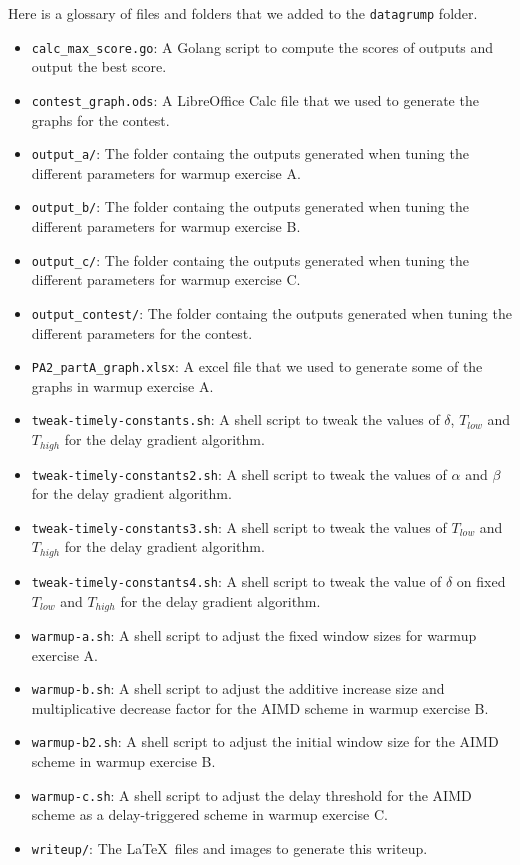 \documentclass[11pt,a4paper]{article}
\begin{document}
Here is a glossary of files and folders that we added to the \texttt{datagrump}
folder. \begin{itemize}
  \item \texttt{calc\_max\_score.go}: A Golang script to compute the scores of
    outputs and output the best score.
  \item \texttt{contest\_graph.ods}: A LibreOffice Calc file that we used to generate
    the graphs for the contest.
  \item \texttt{output\_a/}: The folder containg the outputs generated when
    tuning the different parameters for warmup exercise A.
  \item \texttt{output\_b/}: The folder containg the outputs generated when
    tuning the different parameters for warmup exercise B.
  \item \texttt{output\_c/}: The folder containg the outputs generated when
    tuning the different parameters for warmup exercise C.
  \item \texttt{output\_contest/}: The folder containg the outputs generated when
    tuning the different parameters for the contest.
  \item \texttt{PA2\_partA\_graph.xlsx}: A excel file that we used to generate
    some of the graphs in warmup exercise A.
  \item \texttt{tweak-timely-constants.sh}: A shell script to tweak the values
    of $\delta$, $T_{low}$ and $T_{high}$ for the delay gradient algorithm.
  \item \texttt{tweak-timely-constants2.sh}: A shell script to tweak the values
    of $\alpha$ and $\beta$ for the delay gradient algorithm.
  \item \texttt{tweak-timely-constants3.sh}: A shell script to tweak the values
    of $T_{low}$ and $T_{high}$ for the delay gradient algorithm.
  \item \texttt{tweak-timely-constants4.sh}: A shell script to tweak the value
    of $\delta$ on fixed $T_{low}$ and $T_{high}$ for the delay gradient algorithm.
  \item \texttt{warmup-a.sh}: A shell script to adjust the fixed window sizes for
    warmup exercise A.
  \item \texttt{warmup-b.sh}: A shell script to adjust the additive increase
    size and multiplicative decrease factor for the AIMD scheme in warmup
    exercise B.
  \item \texttt{warmup-b2.sh}: A shell script to adjust the initial window size for
    the AIMD scheme in warmup exercise B.
  \item \texttt{warmup-c.sh}: A shell script to adjust the delay threshold for
    the AIMD scheme as a delay-triggered scheme in warmup
    exercise C.
  \item \texttt{writeup/}: The \LaTeX \   files and images to generate this writeup.
\end{itemize}
\end{document}
